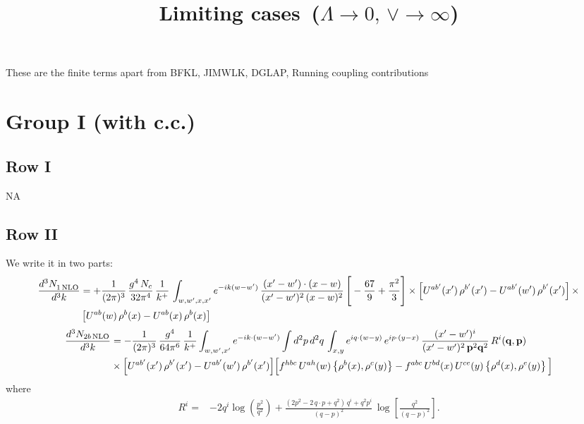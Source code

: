 \documentclass[9pt]{article}
\title{Limiting cases\, ($\Lambda\to 0,\, \vee \to \infty$)}
\author{}
\date{}
\numberwithin{equation}{section}
\begin{document}
\maketitle
{}\par
These are the finite terms apart from BFKL, JIMWLK, DGLAP, Running coupling contributions
\section{Group I (with c.c.)}
\subsection{Row I}
\textsc{NA}
\subsection{Row II}
We write it in two parts:
\begin{align}
     \frac{d^{3}N_{1\,\rm NLO}^{\rm}}{d^{3}k} &  =  +\frac{1}{(2\pi)^{3}}\, \frac{g^{4}\,N_{c}}{32\pi^{4}}\,\frac{1}{k^{+}}\, \int_{w, w',x,x'} e^{-ik(w-w^\prime)}\, \frac{(x'-w')\cdot (x-w)}{(x'-w')^{2}\, (x-w)^{2}}\, \Bigg[ -\frac{67}{9}+\frac{\pi^{2}}{3}\Bigg]\times \left[U^{ab'}(x')\,\rho^{b'}(x') - U^{ab'}(w')\,\rho^{b'}(x')\right]\times\notag \\ & \left[U^{ab}(w)\,\rho^{b}(x) - U^{ab}(x)\,\rho^{b}(x)\right]
\end{align}
\begin{align}
\frac{d^{3}N_{2b\,\rm NLO}}{d^{3}k} & = -\frac{1}{(2\pi)^{3}}\,\frac{g^{4}}{64\pi^{6}}\,\frac{1}{k^{+}}\int_{w,w',x'} e^{-ik\cdot(w-w')}
\int d^{2}p\,d^{2}q\,\int_{x,y} e^{iq\cdot(w-y)}\,e^{ip\cdot(y-x)}\,\frac{(x'-w')^{i}}{(x'-w')^{2}\,\mathbf{p}^{2}\mathbf{q}^{2}}\,R^{i}(\mathbf{q},\mathbf{p})\notag\\
&\times\Big[U^{ab'}(x')\,\rho^{b'}(x')-U^{ab'}(w')\,\rho^{b'}(x')\Big]
\Big[f^{hbc}\,U^{ah}(w)\left\{\rho^{b}(x),\rho^{c}(y)\right\}-f^{abc}\,U^{bd}(x)\,U^{ce}(y)\left\{\rho^{d}(x),\rho^{e}(y)\right\}\Big]
\end{align}
where
\begin{align}
R^{i} =& -2q^{i}\log\left(\frac{p^{2}}{q^{2}}\right)
+\frac{(2p^{2}-2\,q\cdot p+q^{2})\,q^{i}+q^{2}p^{i}}{(q-p)^{2}}\,
\log\left[\frac{q^{2}}{(q-p)^{2}}\right].
\end{align}
\end{document}
